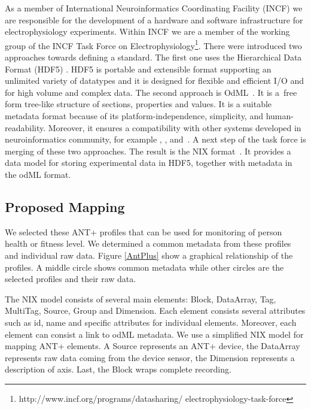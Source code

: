 \documentclass[conference]{IEEEconf}
\begin{document}
As a member of International Neuroinformatics Coordinating Facility (INCF) \cite{wvangeit:Bjaalie:JNeurosci:2007} we are responsible for the development of a hardware and software infrastructure for electrophysiology experiments. Within INCF we are a member of the working group of the INCF Task Force on Electrophysiology\footnote{http://www.incf.org/programs/datasharing/ electrophysiology-task-force}. There were introduced two approaches towards defining a standard. The first one uses the Hierarchical Data Format (HDF5) \cite{hdf5}. HDF5 is portable and extensible format supporting an unlimited variety of datatypes and it is designed for flexible and efficient I/O and for high volume and complex data. The second approach is OdML~\cite{10.3389/fninf.2011.00016}. It is a~free form tree-like structure of sections, properties and values. It is a suitable metadata format because of its platform-independence, simplicity, and human-readability. Moreover, it ensures a compatibility with other systems developed in neuroinformatics community, for example \cite{10.3389/conf.fninf.2014.18.00029}, \cite{10.3389/conf.fninf.2014.18.00053}, and~\cite{10.3389/conf.fninf.2013.09.00025}. A next step of the task force is merging of these two approaches\cite{10.3389/conf.fninf.2013.09.00069}. The result is the NIX format~\cite{Stoewer:2014}. It provides a data model for storing experimental data in HDF5, together with metadata in the odML format.




\subsection{Proposed Mapping}

We selected these ANT+ profiles that can be used for monitoring of person health or fitness level. We determined a common metadata from these profiles and individual raw data. Figure \ref{AntPlus} show a graphical relationship of the profiles. A middle circle shows common metadata while other circles are the selected profiles and their raw data. 

The NIX model consists of several main elements: Block, DataArray, Tag, MultiTag, Source, Group and Dimension. Each element consists several attributes such as id, name and specific attributes for individual elements. Moreover, each element can consist a link to odML metadata. We use a simplified NIX model for mapping ANT+ elements. A Source represents an ANT+ device, the DataArray represents raw data coming from the device sensor, the Dimension represents a description of axis. Last, the Block wraps complete recording.
\end{document}
